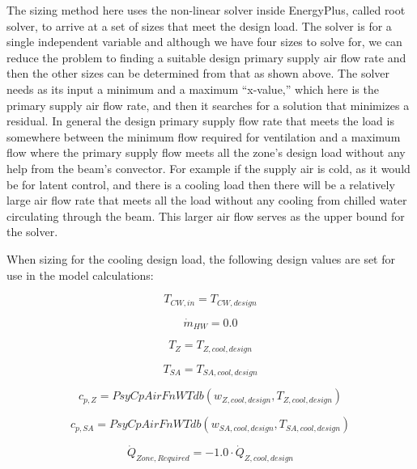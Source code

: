 The sizing method here uses the non-linear solver inside EnergyPlus, called root solver, to arrive at a set of sizes that meet the design load. The solver is for a single independent variable and although we have four sizes to solve for, we can reduce the problem to finding a suitable design primary supply air flow rate and then the other sizes can be determined from that as shown above. The solver needs as its input a minimum and a maximum ``x-value,'' which here is the primary supply air flow rate, and then it searches for a solution that minimizes a residual. In general the design primary supply flow rate that meets the load is somewhere between the minimum flow required for ventilation and a maximum flow where the primary supply flow meets all the zone's design load without any help from the beam's convector. For example if the supply air is cold, as it would be for latent control, and there is a cooling load then there will be a relatively large air flow rate that meets all the load without any cooling from chilled water circulating through the beam. This larger air flow serves as the upper bound for the solver.

When sizing for the cooling design load, the following design values are set for use in the model calculations:

\begin{equation}
  {T_{CW,in}} = {T_{CW,design}}
\end{equation}

\begin{equation}
  {\dot m_{HW}} = 0.0
\end{equation}

\begin{equation}
  {T_{Z}} = {T_{Z,cool,design }}
\end{equation}

\begin{equation}
  {T_{SA}} = {T_{SA,cool,design}}
\end{equation}

\begin{equation}
  {c_{p,Z}} = {PsyCpAirFnWTdb ({w_{Z,cool,design } },  {T_{Z,cool,design } }  ) }
\end{equation}

\begin{equation}
  {c_{p,SA}} = {PsyCpAirFnWTdb ( {w_{SA,cool,design } },  {T_{SA,cool,design } }   ) }
\end{equation}

\begin{equation}
  {\dot Q_{Zone, Required}} = -1.0 \cdot {\dot Q_{Z,cool,design}}
\end{equation}

